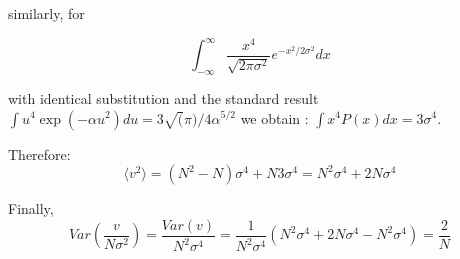 \documentclass[fleqn,usenatbib]{mnras}  %
\begin{document}
similarly, for 

\begin{equation}
\int_{-\infty}^{\infty} \frac{x^{4}}{\sqrt{2\pi \sigma^{2}}} e^{-x^{2} / 2 \sigma^{2}} dx 
\end{equation}

with identical substitution and the standard result  $\int u^{4} \exp(-\alpha u^{2})du =3 \sqrt(\pi)/4\alpha^{5/2}$ we obtain : $\int x^{4} P(x) dx = 3 \sigma^{4}$.  

Therefore:
\begin{equation}
\langle v^{2} \rangle = (N^{2}-N) \sigma^{4} + N 3\sigma^{4} = N^{2}\sigma^{4} + 2N\sigma^{4}
\end{equation}

Finally, 
\begin{equation}
Var\left(\frac{v}{N \sigma^{2}}\right) = \frac{Var(v)}{N^{2} \sigma^{4}}  = \frac{1}{N^{2}\sigma^{4}}(N^{2}\sigma^{4} + 2N\sigma^{4}-N^{2}\sigma^{4}) = \frac{2}{N}
\end{equation}



%



\bsp	%
\label{lastpage}
\end{document}
